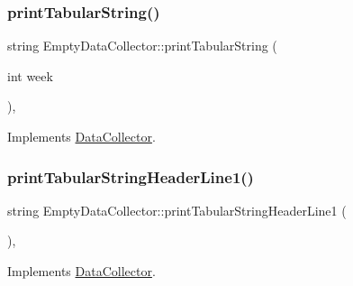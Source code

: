 \mbox{\label{classEmptyDataCollector_a2bb44e454376ed518c4d89cf324b8bd7_a2bb44e454376ed518c4d89cf324b8bd7}} 
\subsubsection{\texorpdfstring{print\+Tabular\+String()}{printTabularString()}}
{\footnotesize\ttfamily string Empty\+Data\+Collector\+::print\+Tabular\+String (\begin{DoxyParamCaption}\item[{int}]{week }\end{DoxyParamCaption})\hspace{0.3cm}{\ttfamily [override]}, {\ttfamily [virtual]}}



Implements \mbox{\hyperlink{classDataCollector_a397fccabe0223267eea8fc7cac0e59da_a397fccabe0223267eea8fc7cac0e59da}{Data\+Collector}}.

\mbox{\label{classEmptyDataCollector_afa47b48abb2ed59c16f1253e55f93cf2_afa47b48abb2ed59c16f1253e55f93cf2}} 
\subsubsection{\texorpdfstring{print\+Tabular\+String\+Header\+Line1()}{printTabularStringHeaderLine1()}}
{\footnotesize\ttfamily string Empty\+Data\+Collector\+::print\+Tabular\+String\+Header\+Line1 (\begin{DoxyParamCaption}{ }\end{DoxyParamCaption})\hspace{0.3cm}{\ttfamily [override]}, {\ttfamily [virtual]}}



Implements \mbox{\hyperlink{classDataCollector_a91619cfa9e9b8cefd2f7c20d5718b41e_a91619cfa9e9b8cefd2f7c20d5718b41e}{Data\+Collector}}.


